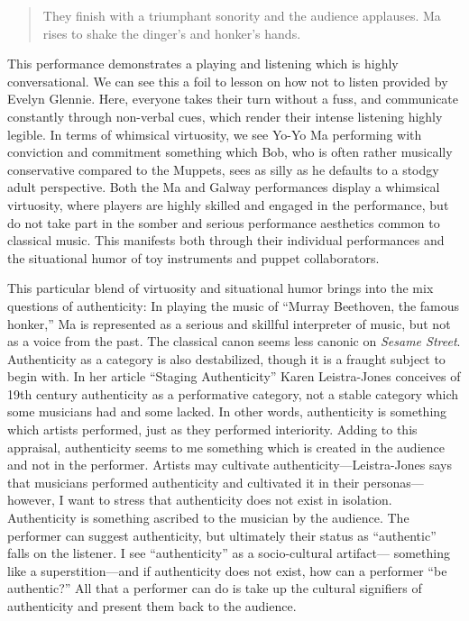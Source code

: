 \documentclass[12pt,letterpaper]{article}
\begin{document}
\begin{quote}
	They finish with a triumphant sonority and the audience applauses. Ma 
	rises to shake the dinger's and honker's hands.\autocite{MaHonkers} 

	\end{quote}

	This performance demonstrates a playing and listening which is highly 
	conversational. We can see this a foil to lesson on how not to listen 
	provided by Evelyn Glennie. Here, everyone takes their turn without a 
	fuss, and communicate constantly through non-verbal cues, which render 
	their intense listening highly legible. In terms of whimsical
	virtuosity, we see Yo-Yo Ma performing with conviction and commitment 
	something which Bob, who is often rather musically conservative compared
	to the Muppets, sees as silly as he defaults to a stodgy adult 
	perspective. Both the Ma and Galway performances 
	display a whimsical virtuosity, where players are highly skilled and 
	engaged in the performance, but do not take part in the somber and 
	serious performance aesthetics common to classical music. This manifests
	both through their individual performances and the situational humor of
	toy instruments and puppet collaborators. 

	This particular blend of virtuosity and situational
	humor brings into the mix questions of authenticity: In playing the
	music of ``Murray Beethoven, the famous honker,'' Ma is represented as a
	serious and skillful interpreter of music, but not as a voice from the 
	past. The classical canon seems less canonic on \textit{Sesame Street}.
	Authenticity as a category is also destabilized, though it is a fraught 	subject to begin with. 
        In her article ``Staging Authenticity'' Karen Leistra-Jones conceives of
	19th century authenticity as a performative category, not a stable 
	category which some musicians had and some 
	lacked.\autocite[400]{Jones2013} In other words, authenticity is 
	something which artists performed, just as they performed interiority. 
	Adding to this appraisal, authenticity seems to me something which is 
	created in the audience and not in the performer. Artists may cultivate
	authenticity---Leistra-Jones says that musicians performed authenticity
	and cultivated it in their personas---however, I want to stress that 
	authenticity does not exist in isolation. Authenticity is something 
	ascribed to the musician by the audience. The performer can suggest 
	authenticity, but ultimately their status as ``authentic'' falls on the 
	listener. I see ``authenticity'' as a socio-cultural artifact---
	something like a superstition---and if authenticity does not exist, how 
	can a performer ``be authentic?'' All that a performer can do is take 
	up the cultural signifiers of authenticity and present them back to the 
	audience.
\end{document}
